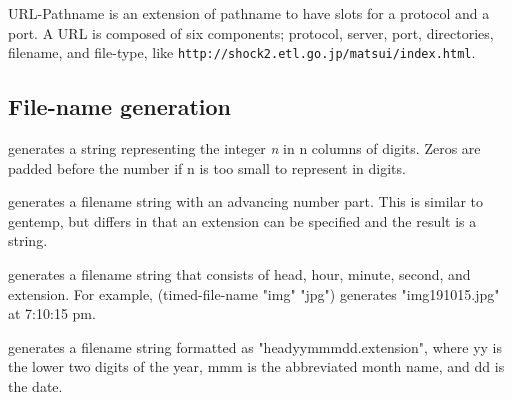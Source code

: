 URL-Pathname is an extension of pathname to have slots for a protocol
and a port.
A URL is composed of six components;
protocol, server, port, directories, filename, and file-type, like
\verb+http://shock2.etl.go.jp/matsui/index.html+.

\begin{refdesc}


\end{refdesc}





\subsection{File-name generation}

\begin{refdesc}

{generates a string representing the integer {\it n} in n columns of
digits.
Zeros are padded before the number if n is too small to represent
in digits.}

{generates a filename string with an advancing number part.
This is similar to gentemp, but differs in that an extension can be specified
and the result is a string.}

{generates a filename string that consists of head, hour, minute, second,
and extension. For example, (timed-file-name "img" "jpg") generates
"img191015.jpg" at 7:10:15 pm.}

{generates a filename string formatted as
"headyymmmdd.extension", where yy is the lower two digits of the year,
mmm is the abbreviated month name, and dd is the date.}

\end{refdesc}
\newpage

